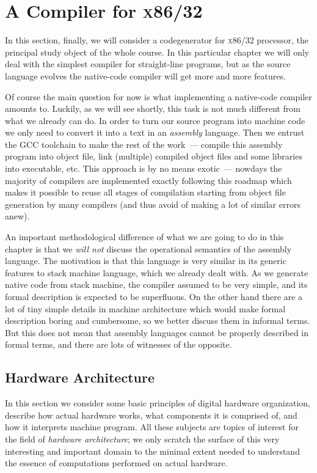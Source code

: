 \chapter{A Compiler for \textsc{x86/32}}

In this section, finally, we will consider a codegenerator for \textsc{x86/32} processor, the principal study
object of the whole course. In this particular chapter we will only deal with the simplest compiler for
straight-line programs, but as the source language evolves the native-code compiler will get more
and more features.

Of course the main question for now is what implementing a native-code compiler amounts to. Luckily, as we will
see shortly, this task is not much different from what we already can do. In order to turn our source program
into machine code we only need to convert it into a text in an \emph{assembly} language. Then we entrust
the \textsc{GCC} toolchain to make the rest of the work~--- compile this assembly program into object file,
link (multiple) compiled object files and some libraries into executable, etc. This approach is by no means
exotic~--- nowdays the majority of compilers are implemented exactly following this roadmap which makes it
possible to reuse all stages of compilation starting from object file generation by many compilers (and thus
avoid of making a lot of similar errors anew).

An important methodological difference of what we are going to do in this chapter is that we \emph{will not}
discuss the operational semantics of the assembly language. The motivation is that this language is very similar
in its generic features to stack machine language, which we already dealt with. As we generate native code from
stack machine, the compiler assumed to be very simple, and its formal description is expected to be superfluous.
On the other hand there are a lot of tiny simple details in machine architecture which would make formal description
boring and cumbersome, so we better discuss them in informal terms. But this does not mean that assembly languages
cannot be properly described in formal terms, and there are lots of witnesses of the opposite.

\section{Hardware Architecture}

In this section we consider some basic principles of digital hardware organization, describe how actual hardware works,
what components it is comprised of, and how it interprets machine program. All these subjects are topics of interest
for the field of \emph{hardware architecture}; we only scratch the surface of this very interesting and important
domain to the minimal extent needed to understand the essence of computations performed on actual hardware.

